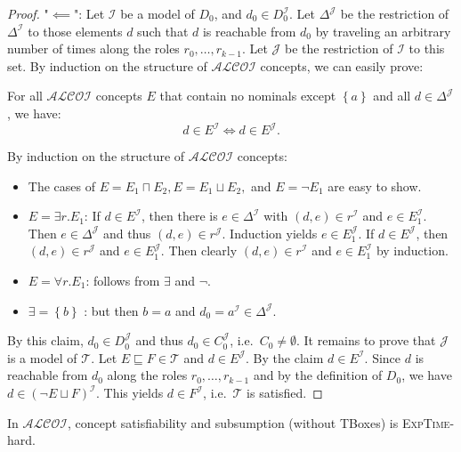 \begin{proof}
	"$ \impliedby$":
	Let $\mathcal{I}$ be a model of $D_0$, and $d_0 \in D_0^\mathcal{I}$.
	Let $\Delta^\mathcal{J}$ be the restriction of $\Delta^\mathcal{I}$ to those elements $d$ 
	such that $d$ is reachable from $d_0$
	by traveling an arbitrary number of times along the roles $r_0, \ldots, r_{k-1}$.
	Let $ \mathcal{J}$ be the restriction of $\mathcal{I}$ to this set.
	By induction on the structure of $\mathcal{ALCOI}$ concepts, we can easily prove:
	\begin{mdframed}
		For all $\mathcal{ALCOI}$ concepts $E$ that contain no nominals except $\left\{ a \right\}$ 
		and all $d \in \Delta^{\mathcal{J}}$, we have:
		\[
			d \in E^\mathcal{I} \iff d \in E^{\mathcal{J}}
		.\]
	\end{mdframed}
	\begin{subproof}
		By induction on the structure of $\mathcal{ALCOI}$ concepts:
		\begin{itemize}
			\item The cases of $E = E_1 \sqcap E_2, E = E_1 \sqcup E_2,$ and $E = \neg E_1$ are easy to show.
			\item $E = \exists r.E_1$:
				If $d \in E^\mathcal{I}$, then there is $e \in \Delta^\mathcal{I}$ with $(d,e) \in r^\mathcal{I}$ and $e \in E_1^\mathcal{I}$.
				Then $e \in \Delta^\mathcal{J}$ and thus $(d, e) \in r^\mathcal{J}$.
				Induction yields $e \in E_1^\mathcal{J}$.
				If $d \in E^\mathcal{J}$, then $(d,e)\in r^\mathcal{J}$ and $e \in E_1^\mathcal{J}$.
				Then clearly $(d,e) \in r^\mathcal{I}$ and $e \in E_1^\mathcal{I}$ by induction.
			\item $E = \forall r.E_1$: follows from $\exists$ and $\neg$.
				\qedhere
			\item $\exists = \left\{ b \right\}$ : but then $b=a$ and $d_0 = a^\mathcal{I} \in \Delta^\mathcal{J}$.
		\end{itemize}
	\end{subproof}
	By this claim, $d_0 \in D_0^\mathcal{J}$ and thus $d_0 \in C_0^\mathcal{J}$, i.e.\ $C_0 \neq \emptyset$.
	It remains to prove that $\mathcal{J}$ is a model of $\mathcal{T}$.
	Let $E \sqsubseteq F \in \mathcal{T}$ and $d \in E^\mathcal{J}$.
	By the claim $d \in E^\mathcal{I}$.
	Since $d$ is reachable from $d_0$ along the roles $r_0, \ldots, r_{k-1}$
	and by the definition of $D_0$, we have $d \in (\neg E \sqcup F)^\mathcal{I}$.
	This yields $d \in F^\mathcal{I}$, i.e.\ $\mathcal{T}$ is satisfied.
\end{proof}

\begin{theorem}
In $\mathcal{ALCOI}$, concept satisfiability and subsumption (without TBoxes) is \textsc{ExpTime}-hard.
\end{theorem}


